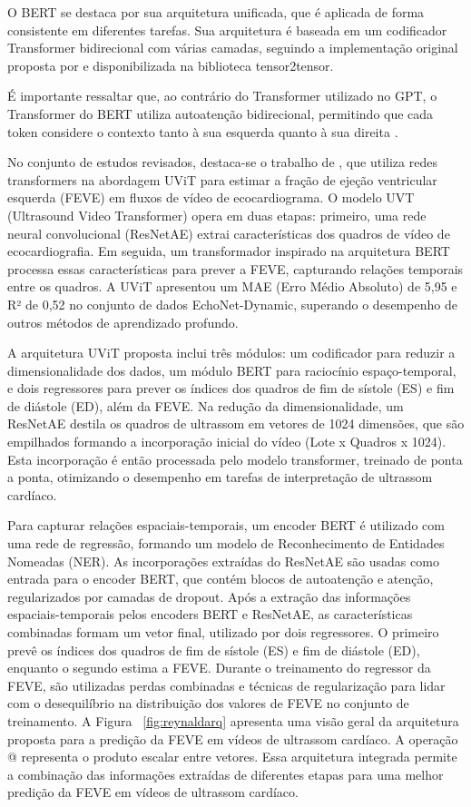 O BERT se destaca por sua arquitetura unificada, que é aplicada de forma consistente em diferentes tarefas. Sua arquitetura é baseada em um codificador Transformer bidirecional com várias camadas, seguindo a implementação original proposta por \textcite{https://doi.org/10.48550/arxiv.1706.03762} e disponibilizada na biblioteca tensor2tensor. 

É importante ressaltar que, ao contrário do Transformer utilizado no GPT, o Transformer do BERT utiliza autoatenção bidirecional, permitindo que cada token considere o contexto tanto à sua esquerda quanto à sua direita \cite{Develin}. 



No conjunto de estudos revisados, destaca-se o trabalho de \textcite{Reynald}, que utiliza redes transformers na abordagem UViT para estimar a fração de ejeção ventricular esquerda (FEVE) em fluxos de vídeo de ecocardiograma. O modelo UVT (Ultrasound Video Transformer) opera em duas etapas: primeiro, uma rede neural convolucional (ResNetAE) extrai características dos quadros de vídeo de ecocardiografia. Em seguida, um transformador inspirado na arquitetura BERT processa essas características para prever a FEVE, capturando relações temporais entre os quadros. A UViT apresentou um MAE (Erro Médio Absoluto) de 5,95 e R² de 0,52 no conjunto de dados EchoNet-Dynamic, superando o desempenho de outros métodos de aprendizado profundo.

A arquitetura UViT proposta inclui três módulos: um codificador para reduzir a dimensionalidade dos dados, um módulo BERT para raciocínio espaço-temporal, e dois regressores para prever os índices dos quadros de fim de sístole (ES) e fim de diástole (ED), além da FEVE. Na redução da dimensionalidade, um ResNetAE destila os quadros de ultrassom em vetores de 1024 dimensões, que são empilhados formando a incorporação inicial do vídeo (Lote x Quadros x 1024). Esta incorporação é então processada pelo modelo transformer, treinado de ponta a ponta, otimizando o desempenho em tarefas de interpretação de ultrassom cardíaco.

Para capturar relações espaciais-temporais, um encoder BERT é utilizado com uma rede de regressão, formando um modelo de Reconhecimento de Entidades Nomeadas (NER). As incorporações extraídas do ResNetAE são usadas como entrada para o encoder BERT, que contém blocos de autoatenção e atenção, regularizados por camadas de dropout. Após a extração das informações espaciais-temporais pelos encoders BERT e ResNetAE, as características combinadas formam um vetor final, utilizado por dois regressores. O primeiro prevê os índices dos quadros de fim de sístole (ES) e fim de diástole (ED), enquanto o segundo estima a FEVE. Durante o treinamento do regressor da FEVE, são utilizadas perdas combinadas e técnicas de regularização para lidar com o desequilíbrio na distribuição dos valores de FEVE no conjunto de treinamento. A Figura ~\ref{fig:reynaldarq} apresenta uma visão geral da arquitetura proposta para a predição da FEVE em vídeos de ultrassom cardíaco. A operação @ representa o produto escalar entre vetores. Essa arquitetura integrada permite a combinação das informações extraídas de diferentes etapas para uma melhor predição da FEVE em vídeos de ultrassom cardíaco.

